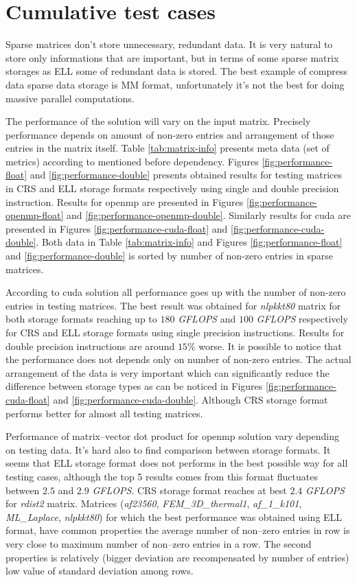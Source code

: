 \chapter{Cumulative test cases}
	Sparse matrices don't store unnecessary, redundant data. It is very natural to store only informations that are important, but in terms of some sparse matrix storages as \gls{ELL} some of redundant data is stored. The best example of compress data sparse data storage is \gls{MM} format, unfortunately it's not the best for doing massive parallel computations.
	
	The performance of the solution will vary on the input matrix. Precisely performance depends on amount of non-zero entries and arrangement of those entries in the matrix itself. Table \ref{tab:matrix-info} presents meta data (set of metrics) according to mentioned before dependency. Figures \ref{fig:performance-float} and \ref{fig:performance-double} presents obtained results for testing matrices in \gls{CRS} and \gls{ELL} storage formats respectively using single and double precision instruction. Results for \gls{openmp} are presented in Figures \ref{fig:performance-openmp-float} and \ref{fig:performance-openmp-double}. Similarly results for \gls{cuda} are presented in Figures \ref{fig:performance-cuda-float} and \ref{fig:performance-cuda-double}. Both data in Table \ref{tab:matrix-info} and Figures \ref{fig:performance-float} and \ref{fig:performance-double} is sorted by number of non-zero entries in sparse matrices.
	
	According to \gls{cuda} solution all performance goes up with the number of non-zero entries in testing matrices. The best result was obtained for \emph{nlpkkt80} matrix for both storage formats reaching up to $180$ \emph{G\gls{FLOPS}} and $100$ \emph{G\gls{FLOPS}} respectively for \gls{CRS} and \gls{ELL} storage formats using single precision instructions. Results for double precision instructions are around $15\%$ worse. It is possible to notice that the performance does not depends only on number of non-zero entries. The actual arrangement of the data is very important which can significantly reduce the difference between storage types as can be noticed in Figures \ref{fig:performance-cuda-float} and \ref{fig:performance-cuda-double}. Although \gls{CRS} storage format performs better for almost all testing matrices.
	
	Performance of matrix--vector dot product for \gls{openmp} solution vary depending on testing data. It's hard also to find comparison between storage formats. It seems that \gls{ELL} storage format does not performs in the best possible way for all testing cases, although the top 5 results comes from this format fluctuates between $2.5$ and $2.9$ \emph{G\gls{FLOPS}}. \gls{CRS} storage format reaches at best $2.4$ \emph{G\gls{FLOPS}} for \emph{rdist2} matrix. Matrices (\emph{af23560}, \emph{FEM\_3D\_thermal1}, \emph{af\_1\_k101}, \emph{ML\_Laplace}, \emph{nlpkkt80}) for which the best performance was obtained using \gls{ELL} format, have common properties the average number of non--zero entries in row is very close to maximum number of non--zero entries in a row. The second properties is relatively (bigger deviation are recompensated by number of entries) low value of standard deviation among rows.
	
